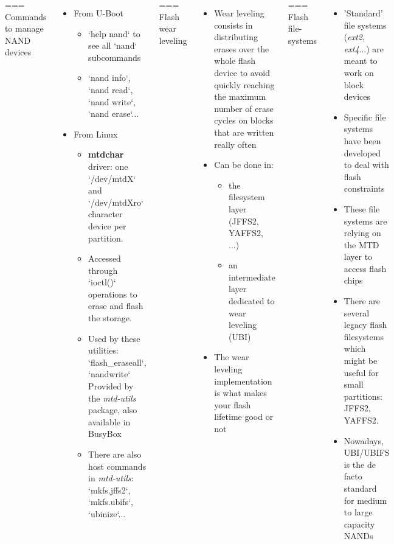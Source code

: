 \begin{columns}
=== Commands to manage NAND devices
  \begin{itemize}
  \item From U-Boot
     \begin{itemize}
     \item `help nand` to see all `nand` subcommands
     \item `nand info`, `nand read`, `nand write`, `nand erase`...
     \end{itemize}
  \item From Linux
     \begin{itemize}
     \item {\bf mtdchar} driver: one `/dev/mtdX` and `/dev/mtdXro`
           character device per partition.
     \item Accessed through `ioctl()` operations to erase and flash
	   the storage.
     \item Used by these utilities: `flash_eraseall`, `nandwrite`\\
           Provided by the {\em mtd-utils} package, also available in BusyBox
     \item There are also host commands in {\em mtd-utils}: `mkfs.jffs2`, `mkfs.ubifs`, `ubinize`...
     \end{itemize}
  \end{itemize}


=== Flash wear leveling
  \begin{itemize}
  \item Wear leveling consists in distributing erases over the whole
    flash device to avoid quickly reaching the maximum number of erase
    cycles on blocks that are written really often
  \item Can be done in:
    \begin{itemize}
    \item the filesystem layer (JFFS2, YAFFS2, ...)
    \item an intermediate layer dedicated to wear leveling (UBI)
    \end{itemize}
  \item The wear leveling implementation is what makes your flash
    lifetime good or not
  \end{itemize}


=== Flash file-systems
  \begin{itemize}
  \item 'Standard' file systems ({\em ext2}, {\em ext4}...) are
        meant to work on block devices
  \item Specific file systems have been developed to deal with
        flash constraints
  \item These file systems are relying on the MTD layer to access
    flash chips
  \item There are several legacy flash filesystems which might be
    useful for small partitions: JFFS2, YAFFS2.
  \item Nowadays, UBI/UBIFS is the de facto standard for medium to
    large capacity NANDs
  \end{itemize}



\end{columns}
